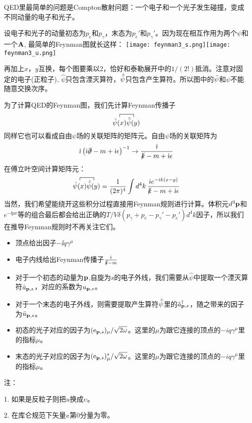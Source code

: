 \documentclass[CJK]{beamer}
\begin{document}
\begin{frame}
\bch
{\small
QED里最简单的问题是Compton散射问题：一个电子和一个光子发生碰撞，变成不同动量的电子和光子。
\skipline

设电子和光子的动量初态为$p_e$和$p_\gamma$，末态为$p_e'$和$p_\gamma'$。因为现在相互作用为两个$\psi$和一个${\mathbf{A}}$, 最简单的Feynman图就长这样：
\texttt{[image: feynman3\_s.png]}\texttt{[image: feynman3\_u.png]}

再加上$x$，$y$互换，每个图要乘以2，恰好和泰勒展开中的$1/(2!)$抵消。注意对固定的电子(正粒子), $\hat\psi$只包含湮灭算符，$\hat{\bar{\psi}}$只包含产生算符。所以图中的$\bar{\psi}$和$\psi$不能随意交换次序。}
\ech
\end{frame}


\begin{frame}
\bch
为了计算QED的Feynman图，我们先计算Feynman传播子
$$\contr{\hat\psi(x)}{\hat{\barpsi}(y)}$$
同样它也可以看成自由$\psi$场的关联矩阵的矩阵元。自由$\psi$场的关联矩阵为
$$ {\dot{\imath}}\left({\dot{\imath}} \slashed{\partial}-m + {\dot{\imath}}\epsilon\right)^{-1} \rightarrow \frac{{\dot{\imath}}}{\slashed{k} - m + {\dot{\imath}}\epsilon}$$
在傅立叶空间计算矩阵元：
$$\contr{\hat\psi(x)}{\hat{\barpsi}(y)} = \frac{1}{(2\pi)^4}\int d^4k\, \frac{\ii e^{-\ii k(x-y)}}{\slashed{k} - m + \ii\epsilon} $$
当然，我们希望能绕开这些积分过程直接用Feynman规则进行计算。体积元$d^3{\mathbf{p}}$和$e^{-\ii px}$等的组合最后都会给出正确的$T/V\delta(p_\gamma+p_e - p_\gamma'-p_e')d^4k$因子，所以我们在推导Feynman规则时不再关注它们。
\ech
\end{frame}

\begin{frame}
\bch
{\small
\begin{itemize}
\item{顶点给出因子$-\ii q \gamma^\mu$}
\item{电子内线给出Feynman传播子$\frac{{\dot{\imath}}}{\slashed{k}-m}$}
\item{对于一个初态的动量为${\mathbf{p}}$,自旋为$s$的电子外线，我们需要从$\hat\psi$中提取一个湮灭算符${\hat{a}}_{{\mathbf{p}},s}$，对应的系数为$u_{{\mathbf{p}}, s}$。}
\item{对于一个末态的电子外线，则需要提取产生算符$\hat{\bar{\psi}}$里的${\hat{a}^\dagger}_{{\mathbf{p}},s}$，随之带来的因子为$\bar{u}_{{\mathbf{p}},s}$。}
\item{初态的光子对应的因子为$(\mathrm{e}_{{\mathbf{p}},s})_\mu/\sqrt{2\omega}$。这里的$\mu$为跟它连接的顶点的$-iq\gamma^\mu$里的指标$\mu$。}
\item{末态的光子对应的因子为$(\mathrm{e}_{{\mathbf{p}},s})_\mu^*/\sqrt{2\omega}$。这里的$\mu$为跟它连接的顶点的$-iq\gamma^\mu$里的指标$\mu$。}
\end{itemize}

{\scriptsize
注：

1. 如果是反粒子则把$u$换成$\upsilon$。

2. 在库仑规范下矢量$\mathrm{e}$第0分量为零。} 

}

\ech
\end{frame}
\end{document}
